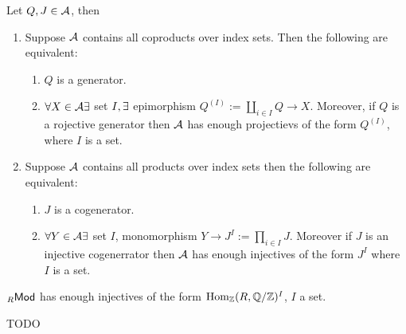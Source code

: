 \documentclass[a4paper]{report}
\begin{document}
\begin{prop} Let $Q, J \in \mathcal{A}$, then
  \begin{enumerate}
\item Suppose $\mathcal{A}$ contains all coproducts  over index sets. Then the following are equivalent:
  \begin{enumerate}
    \item $Q$ is a generator.
    \item $\forall X \in \mathcal{A} \exists$ set $I, \exists$ epimorphism $Q^{(I)}:= \coprod_{i \in I} Q \to X$. Moreover, if $Q$ is a rojective generator then $\mathcal{A}$ has enough projectievs of the form $Q^{(I)}$, where $I$ is a set.
  \end{enumerate}
    \item Suppose $\mathcal{A}$ contains all products over index sets then the following are equivalent:
          \begin{enumerate}
            \item $J$ is a cogenerator.
                  \item $\forall Y \in \mathcal{A} \exists$ set $I$, monomorphism $Y \to J^{I}:= \prod_{i \in I} J$. Moreover if $J$ is an injective cogenerrator then $\mathcal{A}$ has enough injectives of the form $J^I$ where $I$ is a set.
          \end{enumerate}
  \end{enumerate}
\end{prop}
\begin{cor}
${}_R\mathsf{Mod}$ has enough injectives of the form $\Hom_{\Z}(R, \fak \Q\Z)^{I}$, $I$ a set.
\end{cor}
\begin{rem}
TODO
\end{rem}
\end{document}
